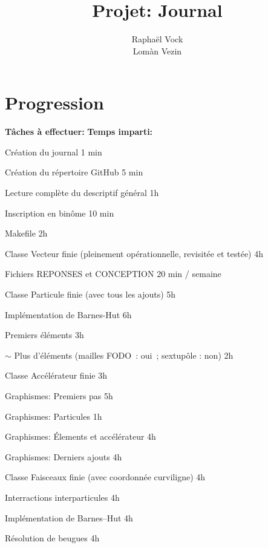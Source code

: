 \documentclass[12pt, letterpaper, twoside]{article}
\title{Projet: Journal}
\author{Raphaël Vock \\ Lomàn Vezin}
\newcommand{\cmark}{\ding{51}}%
\newcommand{\done}{\rlap{$\square$}{\raisebox{2pt}{\large\hspace{1pt}\cmark}}%

\hspace{-2.5pt}}
\begin{document}
\maketitle

\section{Progression}

\textbf{Tâches à effectuer:} \hfill \textbf{Temps imparti:}
\ \linebreak

\begin{todolist}
	\item[\done] Création du journal \hfill 1 min
	\item[\done] Création du répertoire GitHub \hfill 5 min
	\item[\done] Lecture complète du descriptif général \hfill 1h
	\item[\done] Inscription en binôme \hfill 10 min
	\item[\done] Makefile \hfill 2h
	\item[\done] Classe Vecteur finie (pleinement opérationnelle, revisitée et testée) \hfill 4h
	\item[\done] Fichiers REPONSES et CONCEPTION \hfill 20 min / semaine
	\item[\done] Classe Particule finie (avec tous les ajouts) \hfill 5h
	\item[\done] Implémentation de Barnes-Hut \hfill 6h
	\item[\done] Premiers éléments \hfill 3h
	\item[$\sim$] Plus d'éléments (mailles FODO : oui ; sextupôle : non) \hfill 2h
	\item[\done] Classe Accélérateur finie \hfill 3h
	\item[\done] Graphismes: Premiers pas \hfill 5h
	\item[\done] Graphismes: Particules \hfill 1h
	\item[\done] Graphismes: Élements et accélérateur \hfill 4h
	\item[\done] Graphismes: Derniers ajouts \hfill 4h
	\item[\done] Classe Faisceaux finie (avec coordonnée curviligne) \hfill 4h
	\item[\done] Interractions interparticules \hfill 4h
	\item[\done] Implémentation de Barnes--Hut \hfill 4h
	\item[\done] Résolution de beugues \hfill 4h
\end{todolist}
\newpage
\end{document}
